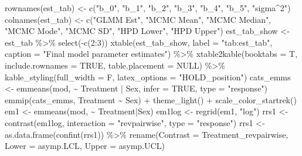 \documentclass[12pt]{article}
\newenvironment{Shaded}{\begin{snugshade}}{\end{snugshade}}
\newcommand{\AttributeTok}[1]{\textcolor[rgb]{0.77,0.63,0.00}{#1}}
\newcommand{\ConstantTok}[1]{\textcolor[rgb]{0.00,0.00,0.00}{#1}}
\newcommand{\DecValTok}[1]{\textcolor[rgb]{0.00,0.00,0.81}{#1}}
\newcommand{\FunctionTok}[1]{\textcolor[rgb]{0.00,0.00,0.00}{#1}}
\newcommand{\NormalTok}[1]{#1}
\newcommand{\OtherTok}[1]{\textcolor[rgb]{0.56,0.35,0.01}{#1}}
\newcommand{\SpecialCharTok}[1]{\textcolor[rgb]{0.00,0.00,0.00}{#1}}
\newcommand{\StringTok}[1]{\textcolor[rgb]{0.31,0.60,0.02}{#1}}
\begin{document}
\begin{Shaded}
\begin{Highlighting}[]
\FunctionTok{rownames}\NormalTok{(est\_tab) }\OtherTok{\textless{}{-}} \FunctionTok{c}\NormalTok{(}\StringTok{"b\_0"}\NormalTok{, }\StringTok{"b\_1"}\NormalTok{, }\StringTok{"b\_2"}\NormalTok{, }\StringTok{"b\_3"}\NormalTok{, }
                       \StringTok{"b\_4"}\NormalTok{, }\StringTok{"b\_5"}\NormalTok{, }\StringTok{"sigma\^{}2"}\NormalTok{)}
\FunctionTok{colnames}\NormalTok{(est\_tab) }\OtherTok{\textless{}{-}} \FunctionTok{c}\NormalTok{(}\StringTok{"GLMM Est"}\NormalTok{, }\StringTok{"MCMC Mean"}\NormalTok{, }\StringTok{"MCMC Median"}\NormalTok{, }
                       \StringTok{"MCMC Mode"}\NormalTok{, }\StringTok{"MCMC SD"}\NormalTok{, }\StringTok{"HPD Lower"}\NormalTok{, }\StringTok{"HPD Upper"}\NormalTok{)}
\NormalTok{est\_tab\_show }\OtherTok{\textless{}{-}}\NormalTok{ est\_tab }\SpecialCharTok{\%\textgreater{}\%} \FunctionTok{select}\NormalTok{(}\SpecialCharTok{{-}}\FunctionTok{c}\NormalTok{(}\DecValTok{2}\SpecialCharTok{:}\DecValTok{3}\NormalTok{))}
\FunctionTok{xtable}\NormalTok{(est\_tab\_show, }\AttributeTok{label =} \StringTok{"tab:est\_tab"}\NormalTok{, }
       \AttributeTok{caption =} \StringTok{"Final model parameter estimates"}\NormalTok{) }\SpecialCharTok{\%\textgreater{}\%}
  \FunctionTok{xtable2kable}\NormalTok{(}\AttributeTok{booktabs =}\NormalTok{ T, }\AttributeTok{include.rownames =} \ConstantTok{TRUE}\NormalTok{,}
               \AttributeTok{table.placement =} \ConstantTok{NULL}\NormalTok{) }\SpecialCharTok{\%\textgreater{}\%}
  \FunctionTok{kable\_styling}\NormalTok{(}\AttributeTok{full\_width =}\NormalTok{ F, }\AttributeTok{latex\_options =} \StringTok{"HOLD\_position"}\NormalTok{) }
\NormalTok{cats\_emms }\OtherTok{\textless{}{-}} \FunctionTok{emmeans}\NormalTok{(mod, }\SpecialCharTok{\textasciitilde{}}\NormalTok{ Treatment }\SpecialCharTok{|}\NormalTok{ Sex, }\AttributeTok{infer =} \ConstantTok{TRUE}\NormalTok{, }\AttributeTok{type =} \StringTok{"response"}\NormalTok{)}
\FunctionTok{emmip}\NormalTok{(cats\_emms, Treatment }\SpecialCharTok{\textasciitilde{}}\NormalTok{ Sex) }\SpecialCharTok{+} 
  \FunctionTok{theme\_light}\NormalTok{() }\SpecialCharTok{+} \FunctionTok{scale\_color\_startrek}\NormalTok{()}
\NormalTok{em1 }\OtherTok{\textless{}{-}} \FunctionTok{emmeans}\NormalTok{(mod, }\SpecialCharTok{\textasciitilde{}}\NormalTok{ Treatment}\SpecialCharTok{|}\NormalTok{Sex)}
\NormalTok{em1log }\OtherTok{\textless{}{-}} \FunctionTok{regrid}\NormalTok{(em1, }\StringTok{"log"}\NormalTok{)}
\NormalTok{rrs1 }\OtherTok{\textless{}{-}} \FunctionTok{contrast}\NormalTok{(em1log, }\AttributeTok{interaction =} \StringTok{"revpairwise"}\NormalTok{, }\AttributeTok{type =} \StringTok{"response"}\NormalTok{)}
\NormalTok{rrs1 }\OtherTok{\textless{}{-}} \FunctionTok{as.data.frame}\NormalTok{(}\FunctionTok{confint}\NormalTok{(rrs1)) }\SpecialCharTok{\%\textgreater{}\%}
  \FunctionTok{rename}\NormalTok{(}\AttributeTok{Contrast =}\NormalTok{ Treatment\_revpairwise, }\AttributeTok{Lower =}\NormalTok{ asymp.LCL, }\AttributeTok{Upper =}\NormalTok{ asymp.UCL)}


\end{Highlighting}
\end{Shaded}
\end{document}
